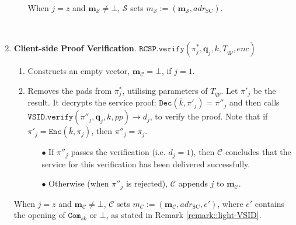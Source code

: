 \begin{enumerate}
\begin{enumerate}
\begin{itemize}
\end{itemize}
When $j=z$  and $\bm{m}_{\scriptscriptstyle\mathcal{S}}\neq\bot$, $\mathcal S$ sets    $m_{\scriptscriptstyle\mathcal S}:=(\bm{m}_{\scriptscriptstyle\mathcal{S}},adr_{\scriptscriptstyle \text{SC}})$.

\end{enumerate}

\

\item \textbf{Client-side Proof Verification}.\label{Client-sideProofVerification} $\mathtt{RCSP}.\mathtt{verify}(\pi^{\scriptscriptstyle *}_{\scriptscriptstyle j}, \bm{q}_{\scriptscriptstyle j},k,T_{\scriptscriptstyle qp},enc)$
\begin{enumerate}


\item Constructs an empty vector, $\bm{m}_{\scriptscriptstyle\mathcal C}=\bot$, if $j=1$. 

\item Removes the pads from $\pi^{\scriptscriptstyle *}_{\scriptscriptstyle j}$, utilising  parameters of $T_{\scriptscriptstyle qp}$. Let $\pi'_{\scriptscriptstyle j}$ be the result. It decrypts the service proof: $\mathtt{Dec}(\bar{k},\pi'_{\scriptscriptstyle j})=\pi''_{\scriptscriptstyle j}$ and then calls $\mathtt{VSID.verify}(\pi''_{\scriptscriptstyle j}, \bm{q}_{\scriptscriptstyle j},k, {pp})\rightarrow d_{\scriptscriptstyle j}$, to verify the proof. Note that if $\pi'_{\scriptscriptstyle j}=\mathtt{Enc}(\bar{k},\pi_{\scriptscriptstyle j})$, then $\pi''_{\scriptscriptstyle j}=\pi_{\scriptscriptstyle j}$. 

\begin{itemize}
\item[$\bullet$] If $\pi''_{\scriptscriptstyle j}$ passes the verification (i.e. $d_{\scriptscriptstyle j}=1$), then $\mathcal C$ concludes that the service  for this verification has been delivered successfully. 

\item[$\bullet$]  Otherwise (when $\pi''_{\scriptscriptstyle j}$ is rejected), $\mathcal C$ appends $j$  to $\bm{m}_{\scriptscriptstyle\mathcal{C}}$. 


\end{itemize}
\end{enumerate}
When $j=z$  and $\bm{m}_{\scriptscriptstyle\mathcal{C}}\neq\bot$, $\mathcal C$ sets    ${m}_{\scriptscriptstyle\mathcal C}:=(\bm{m}_{\scriptscriptstyle\mathcal{C}},adr_{\scriptscriptstyle \text{SC}},e')$, where  $e'$  contains the opening of $\mathtt{Com}_{\scriptscriptstyle sk}$ or  $\bot$, as stated in Remark \ref{remark::light-VSID}.





\end{enumerate}
